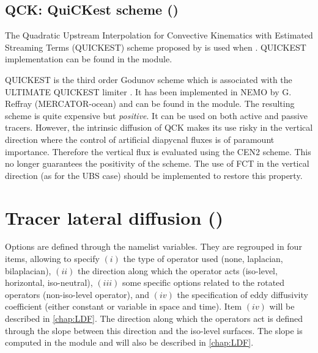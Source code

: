 \documentclass[../main/NEMO_manual]{subfiles}
\begin{document}
\subsection{QCK: QuiCKest scheme (\protect{})}
\label{subsec:TRA_adv_qck}

The Quadratic Upstream Interpolation for Convective Kinematics with Estimated Streaming Terms (QUICKEST) scheme
proposed by \citet{Leonard1979} is used when .
QUICKEST implementation can be found in the  module.

QUICKEST is the third order Godunov scheme which is associated with the ULTIMATE QUICKEST limiter
\citep{Leonard1991}.
It has been implemented in NEMO by G. Reffray (MERCATOR-ocean) and can be found in the  module.
The resulting scheme is quite expensive but \emph{positive}.
It can be used on both active and passive tracers.
However, the intrinsic diffusion of QCK makes its use risky in the vertical direction where
the control of artificial diapycnal fluxes is of paramount importance.
Therefore the vertical flux is evaluated using the CEN2 scheme.
This no longer guarantees the positivity of the scheme.
The use of FCT in the vertical direction (as for the UBS case) should be implemented to restore this property.



\section{Tracer lateral diffusion (\protect{})}
\label{sec:TRA_ldf}

 
Options are defined through the  namelist variables.
They are regrouped in four items, allowing to specify 
$(i)$   the type of operator used (none, laplacian, bilaplacian),
$(ii)$  the direction along which the operator acts (iso-level, horizontal, iso-neutral),
$(iii)$ some specific options related to the rotated operators (\ie non-iso-level operator), and
$(iv)$  the specification of eddy diffusivity coefficient (either constant or variable in space and time).
Item $(iv)$ will be described in \autoref{chap:LDF}.
The direction along which the operators act is defined through the slope between
this direction and the iso-level surfaces.
The slope is computed in the  module and will also be described in \autoref{chap:LDF}.
\end{document}
